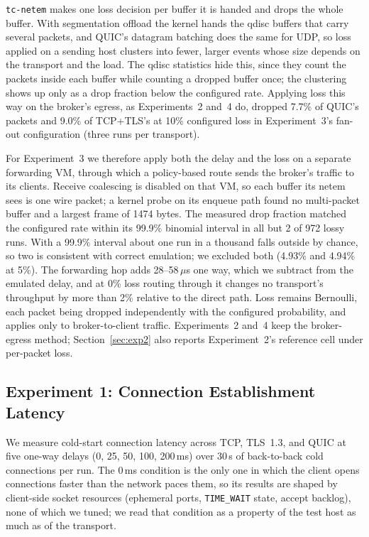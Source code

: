 \documentclass[a4paper,fleqn]{cas-dc}
\begin{document}
\texttt{tc-netem} makes one loss decision per buffer it is handed and drops the whole buffer. With segmentation offload the kernel hands the qdisc buffers that carry several packets, and QUIC's datagram batching does the same for UDP, so loss applied on a sending host clusters into fewer, larger events whose size depends on the transport and the load. The qdisc statistics hide this, since they count the packets inside each buffer while counting a dropped buffer once; the clustering shows up only as a drop fraction below the configured rate. Applying loss this way on the broker's egress, as Experiments~2 and~4 do, dropped 7.7\% of QUIC's packets and 9.0\% of TCP+TLS's at 10\% configured loss in Experiment~3's fan-out configuration (three runs per transport).

For Experiment~3 we therefore apply both the delay and the loss on a separate forwarding VM, through which a policy-based route sends the broker's traffic to its clients. Receive coalescing is disabled on that VM, so each buffer its netem sees is one wire packet; a kernel probe on its enqueue path found no multi-packet buffer and a largest frame of 1474 bytes. The measured drop fraction matched the configured rate within its 99.9\% binomial interval in all but 2 of 972 lossy runs. With a 99.9\% interval about one run in a thousand falls outside by chance, so two is consistent with correct emulation; we excluded both (4.93\% and 4.94\% at 5\%). The forwarding hop adds 28--58\,$\mu$s one way, which we subtract from the emulated delay, and at 0\% loss routing through it changes no transport's throughput by more than 2\% relative to the direct path. Loss remains Bernoulli, each packet being dropped independently with the configured probability, and applies only to broker-to-client traffic. Experiments~2 and~4 keep the broker-egress method; Section~\ref{sec:exp2} also reports Experiment~2's reference cell under per-packet loss.

\subsection{Experiment 1: Connection Establishment Latency}

We measure cold-start connection latency across TCP, TLS~1.3, and QUIC at five one-way delays (0, 25, 50, 100, 200\,ms) over 30\,s of back-to-back cold connections per run. The 0\,ms condition is the only one in which the client opens connections faster than the network paces them, so its results are shaped by client-side socket resources (ephemeral ports, \texttt{TIME\_WAIT} state, accept backlog), none of which we tuned; we read that condition as a property of the test host as much as of the transport.
\end{document}
